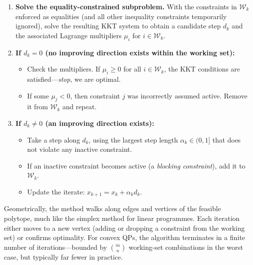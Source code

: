 \begin{enumerate}
	\item \textbf{Solve the equality-constrained subproblem.} With the constraints in $\mathcal{W}_k$ enforced as equalities (and all other inequality constraints temporarily ignored), solve the resulting KKT system to obtain a candidate step $d_k$ and the associated Lagrange multipliers $\mu_i$ for $i \in \mathcal{W}_k$.

	\item \textbf{If $d_k = 0$ (no improving direction exists within the working set):}
	\begin{itemize}
		\item Check the multipliers. If $\mu_i \geq 0$ for all $i \in \mathcal{W}_k$, the KKT conditions are satisfied---\emph{stop}, we are optimal.
		\item If some $\mu_j < 0$, then constraint $j$ was incorrectly assumed active. Remove it from $\mathcal{W}_k$ and repeat.
	\end{itemize}

	\item \textbf{If $d_k \neq 0$ (an improving direction exists):}
	\begin{itemize}
		\item Take a step along $d_k$, using the largest step length $\alpha_k \in (0, 1]$ that does not violate any inactive constraint.
		\item If an inactive constraint becomes active (a \emph{blocking constraint}), add it to $\mathcal{W}_k$.
		\item Update the iterate: $x_{k+1} = x_k + \alpha_k d_k$.
	\end{itemize}
\end{enumerate}

Geometrically, the method walks along edges and vertices of the feasible polytope, much like the simplex method for linear programmes. Each iteration either moves to a new vertex (adding or dropping a constraint from the working set) or confirms optimality. For convex QPs, the algorithm terminates in a finite number of iterations---bounded by $\binom{m}{n}$ working-set combinations in the worst case, but typically far fewer in practice.

